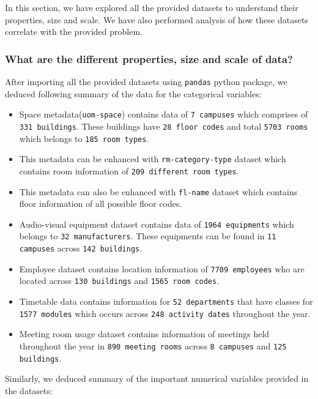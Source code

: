 In this section, we have explored all the provided datasets to understand their properties, size and scale. We have also performed analysis of how these datasets correlate with the provided problem.

\subsubsection{What are the different properties, size and scale of data?}

After importing all the provided datasets using \texttt{pandas} python package, we deduced following summary of the data for the categorical variables:

\begin{itemize}
    \item Space metadata(\texttt{uom-space}) contains data of \texttt{7 campuses} which comprises of \texttt{331 buildings}. These buildings have \texttt{28 floor codes} and total \texttt{5703 rooms} which belongs to \texttt{185 room types}. 
    \item This metadata can be enhanced with \texttt{rm-category-type} dataset which contains room information of \texttt{209 different room types}.
    \item This metadata can also be enhanced with \texttt{fl-name} dataset which contains floor information of all possible floor codes.
    \item Audio-visual equipment dataset contains data of  \texttt{1964 equipments} which belongs to \texttt{32 manufacturers}. These equipments can be found in \texttt{11 campuses} across \texttt{142 buildings}.
    \item Employee dataset contains location information of \texttt{7709 employees} who are located across \texttt{130 buildings} and \texttt{1565 room codes}.
    \item Timetable data contains information for \texttt{52 departments} that have classes for \texttt{1577 modules} which occurs across \texttt{248 activity dates} throughout the year.
    \item Meeting room usage dataset contains information of meetings held throughout the year in \texttt{890 meeting rooms} across \texttt{8 campuses} and \texttt{125 buildings}.
\end{itemize}

Similarly, we deduced summary of the important numerical variables provided in the datasets:

